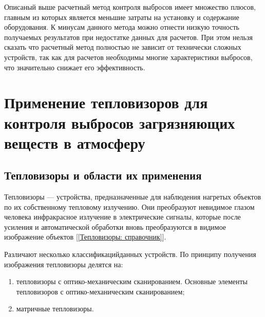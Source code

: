 \documentclass[14pt, a4paper]{extreport}
\begin{document}
	Описаный выше расчетный метод контроля выбросов имеет множество плюсов, главным из которых является меньшие затраты на установку и содержание оборудования. К минусам данного метода можно отнести низкую точность получаемых результатов при недостатке данных для расчетов. При этом нельзя сказать что расчетный метод полностью не зависит от технически сложных устройств, так как для расчетов необходимы многие характеристики выбросов, что значительно снижает его эффективность.
	
\section [\vspace*{-0.22cm}Применение тепловизоров для контроля выбросов загрязняющих \hspace*{-0.9cm} веществ в атмосферу]{\vspace*{-0.22cm}Применение тепловизоров для контроля выбросов загрязняющих \\ \hspace*{-2.25cm} веществ в атмосферу}
\subsection{Тепловизоры и области их применения}
	Тепловизоры — устройства, предназначенные для наблюдения нагретых объектов по их собственному тепловому излучению. Они преобразуют невидимое глазом человека инфракрасное излучение в электрические сигналы, которые после усиления и автоматической обработки вновь преобразуются в видимое изображение объектов [\ref{Тепловизоры: справочник}].
	
	Различают несколько классификацийданных устройств. По принципу получения изображения тепловизоры делятся на:
	\begin{enumerate}[label={\arabic*)}]
		\item тепловизоры с оптико-механическим сканированием. Основные элементы тепловизоров с оптико-механическим сканированием;
		\item матричные тепловизоры.
	\end{enumerate}	
\end{document}

